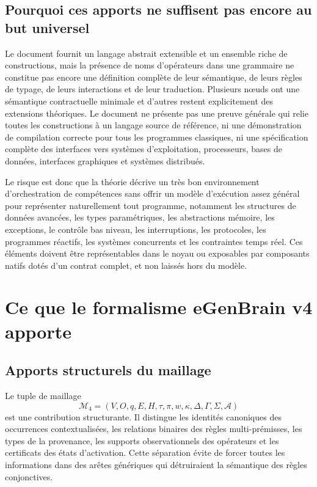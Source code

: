 \documentclass[11pt,a4paper]{article}
\begin{document}
\subsection{Pourquoi ces apports ne suffisent pas encore au but universel}
Le document fournit un langage abstrait extensible et un ensemble riche de constructions, mais la présence de noms d'opérateurs dans une grammaire ne constitue pas encore une définition complète de leur sémantique, de leurs règles de typage, de leurs interactions et de leur traduction. Plusieurs nœuds ont une sémantique contractuelle minimale et d'autres restent explicitement des extensions théoriques. Le document ne présente pas une preuve générale qui relie toutes les constructions à un langage source de référence, ni une démonstration de compilation correcte pour tous les programmes classiques, ni une spécification complète des interfaces vers systèmes d'exploitation, processeurs, bases de données, interfaces graphiques et systèmes distribués.

Le risque est donc que la théorie décrive un très bon environnement d'orchestration de compétences sans offrir un modèle d'exécution assez général pour représenter naturellement tout programme, notamment les structures de données avancées, les types paramétriques, les abstractions mémoire, les exceptions, le contrôle bas niveau, les interruptions, les protocoles, les programmes réactifs, les systèmes concurrents et les contraintes temps réel. Ces éléments doivent être représentables dans le noyau ou exposables par composants natifs dotés d'un contrat complet, et non laissés hors du modèle.

\section{Ce que le formalisme eGenBrain v4 apporte}
\subsection{Apports structurels du maillage}
Le tuple de maillage
\[
\mathcal M_4=(V,O,q,E,H,\tau,\pi,w,\kappa,\Delta,\Gamma,\Sigma,\mathcal A)
\]
est une contribution structurante. Il distingue les identités canoniques des occurrences contextualisées, les relations binaires des règles multi-prémisses, les types de la provenance, les supports observationnels des opérateurs et les certificats des états d'activation. Cette séparation évite de forcer toutes les informations dans des arêtes génériques qui détruiraient la sémantique des règles conjonctives.
\end{document}
